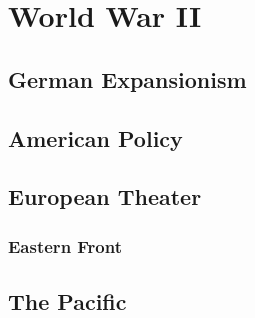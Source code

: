 \chapter{World War II}

\section{German Expansionism}

\section{American Policy}

\section{European Theater}

\subsection*{Eastern Front}

\section{The Pacific}

